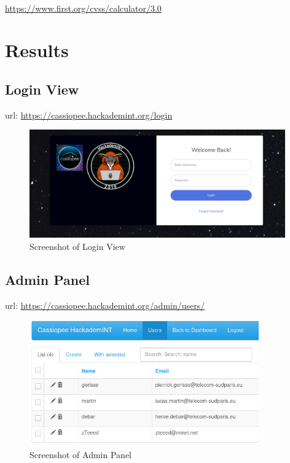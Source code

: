 \\
\vspace{0.2cm}
\url{https://www.first.org/cvss/calculator/3.0}

\pagebreak

\section{Results}

\subsection{Login View}
url: \url{https://cassiopee.hackademint.org/login}

\begin{figure}[!h]
  \centering
  \includegraphics[width=0.98\textwidth]{images/flask-application-01.png}
  \caption{Screenshot of Login View}
  \label{LoginView}
\end{figure}


\subsection{Admin Panel}
url: \url{https://cassiopee.hackademint.org/admin/users/}

\begin{figure}[!h]
  \centering
  \includegraphics[width=0.88\textwidth]{images/flask-application-0.png}
  \caption{Screenshot of Admin Panel}
  \label{AdminPanel}
\end{figure}

